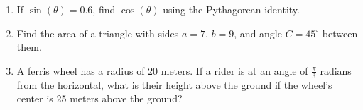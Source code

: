 \begin{enumerate}
    \item If $\sin(\theta) = 0.6$, find $\cos(\theta)$ using the Pythagorean identity.
    \begin{center}
    \end{center}

    \item Find the area of a triangle with sides $a = 7$, $b = 9$, and angle $C = 45^\circ$ between them.
    \begin{center}
    \end{center}

    \item A ferris wheel has a radius of 20 meters. If a rider is at an angle of $\frac{\pi}{3}$ radians from the horizontal, what is their height above the ground if the wheel's center is 25 meters above the ground?
    \begin{center}
    \end{center}

\end{enumerate}

